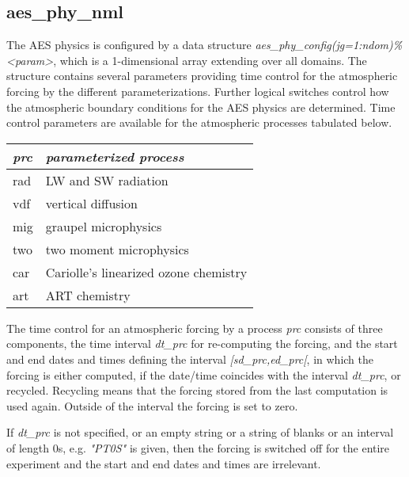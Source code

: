 \subsection{aes\_phy\_nml}

The AES physics is configured by a data structure \textit{aes\_phy\_config(jg=1:ndom)\%<param>},
which is a 1-dimensional array extending over all domains. The structure contains
several parameters providing time control for the atmospheric forcing by the different
parameterizations. Further logical switches control how the atmospheric boundary conditions
for the AES physics are determined. Time control parameters are available for the atmospheric
processes tabulated below.

\begin{table}[htbp]
\begin{center}
\begin{tabular}{l|l}
\textit{prc} & \textit{parameterized process} \\
\hline
rad & LW and SW radiation \\
vdf & vertical diffusion \\
mig & graupel microphysics \\
two & two moment microphysics \\
car & Cariolle's linearized ozone chemistry \\
art & ART chemistry \\
\end{tabular}
\end{center}
\label{default}
\end{table}%

The time control for an atmospheric forcing by a process \textit{prc} consists of
three components, the time interval \textit{dt\_prc} for re-computing the forcing,
and the start and end dates and times defining the interval \textit{[sd\_prc,ed\_prc[},
in which the forcing is either computed, if the date/time coincides with the interval
\textit{dt\_prc}, or recycled. Recycling means that the forcing stored from the last
computation is used again. Outside of the interval the forcing is set to zero.

If \textit{dt\_prc} is not specified, or an empty string or a string of blanks or an
interval of length 0s, e.g. \textit{"PT0S"} is given, then the forcing is switched
off for the entire experiment and the start and end dates and times are irrelevant.

